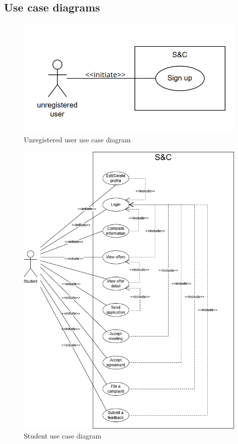 \subsection{Use case diagrams}
\label{subsec: use_case_diag}%

\begin{figure}[H]
    \centering
    \includegraphics[width=0.8\linewidth]{Images/use case diagrams/UNREGISTERED_USER.png}
    \caption{Unregistered user use case diagram}
    \label{fig:enter-label}
\end{figure}

\begin{figure}[H]
    \centering
    \includegraphics[width=1\linewidth]{Images/use case diagrams/STUDENT.png}
    \caption{Student use case diagram}
    \label{fig:enter-label}
\end{figure}

